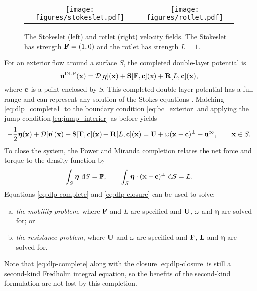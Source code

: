 \begin{figure}[!h]
\begin{center}
\begin{tabular}{c c}
	\texttt{[image: figures/stokeslet.pdf]}
&
	\texttt{[image: figures/rotlet.pdf]}
\end{tabular}
\caption[Velocity fields of a Stokeslet and a rotlet]{The Stokeslet (left) and rotlet (right) velocity fields. The Stokeslet has strength ${\mathbf{F}} =( 1, 0)$ and the rotlet has strength $L=1$. }\label{fig:singularity}
\end{center}
\end{figure}

For an exterior flow around a surface $S$, the completed double-layer potential is
\begin{equation}\label{eq:dlp_complete1} {\mathbf{u}}^\text{DLP}({\mathbf{x}}) = \mathcal{D}[\bm{\eta}]({\mathbf{x}}) + {\mathbf{S}}[{\mathbf{F}},{\mathbf{c}}]({\mathbf{x}}) + {\mathbf{R}}[L,{\mathbf{c}}]({\mathbf{x}}),\end{equation}
where ${\mathbf{c}}$ is a point enclosed by $S$. This completed double-layer potential has a full range and can represent any solution of the Stokes equations \cite{Power1987, Power1993}. Matching \eqref{eq:dlp_complete1} to the boundary condition \eqref{eq:bc_exterior} and applying the jump condition \eqref{eq:jump_interior} as before yields
\begin{equation}\label{eq:dlp-complete}  -\frac{1}{2}\bm{\eta}({\mathbf{x}}) + \mathcal{D}[\bm{\eta}]({\mathbf{x}}) + {\mathbf{S}}[{\mathbf{F}},{\mathbf{c}}]({\mathbf{x}}) + {\mathbf{R}}[L,{\mathbf{c}}]({\mathbf{x}}) = {\mathbf{U}} + \omega({\mathbf{x}} - {\mathbf{c}})^\perp - {\mathbf{u}}^{\infty}, \qquad {\mathbf{x}}\in S.\end{equation}
To close the system, the Power and Miranda completion relates the net force and torque to the density function by
\begin{equation}\label{eq:dlp-closure} \int_S \bm{\eta}~\text{d}S = {\mathbf{F}}, \qquad \int_S \bm{\eta}\cdot({\mathbf{x}} - {\mathbf{c}})^\perp~\text{d}S = L.\end{equation}
Equations \eqref{eq:dlp-complete} and \eqref{eq:dlp-closure} can be used to solve:
\begin{enumerate}[(a)]
	\item \emph{the mobility problem}, where ${\mathbf{F}}$ and $L$ are specified and ${\mathbf{U}}$, $\omega$ and $\bm{\eta}$ are solved for; or
	\item \emph{the resistance problem}, where ${\mathbf{U}}$ and $\omega$ are specified and ${\mathbf{F}}$, ${\mathbf{L}}$ and $\bm{\eta}$ are solved for.
\end{enumerate}
Note that \eqref{eq:dlp-complete} along with the closure \eqref{eq:dlp-closure} is still a second-kind Fredholm integral equation, so the benefits of the second-kind formulation are not lost by this completion. 


